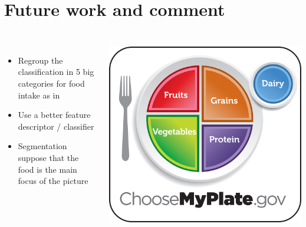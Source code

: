\documentclass[aspectratio=169]{beamer}
\let\oldsection\section
\renewcommand{\section}[1]{
    \oldsection{#1}	
    \subsection{}
}
\newenvironment{myframe}[1][t]{\begin{frame}[#1]{\secname}{\subsecname}}{\end{frame}}
\begin{document}
    \section{Future work and comment}
    
    \begin{myframe}
        \begin{columns}
            \renewcommand{\baselinestretch}{1.5}\normalsize
            \begin{itemize}
                \item Regroup the classification in 5 big categories for food intake as in \cite{Aizawa2013}
                
                \item Use a better feature descriptor / classifier
                
                \item Segmentation suppose that the food is the main focus of the picture
            \end{itemize}
            \centering
            \includegraphics[scale=0.25]{../img/choosemyplate.jpg}
        \end{columns}
        
    \end{myframe}
    
\end{document}
